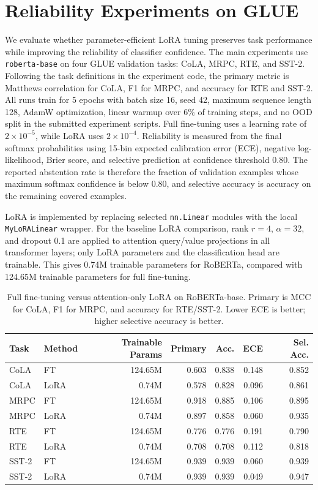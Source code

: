 \section{Reliability Experiments on GLUE}
\label{sec:cola-reliability}

We evaluate whether parameter-efficient LoRA tuning preserves task performance while improving the reliability of classifier confidence. The main experiments use \texttt{roberta-base} on four GLUE validation tasks: CoLA, MRPC, RTE, and SST-2. Following the task definitions in the experiment code, the primary metric is Matthews correlation for CoLA, F1 for MRPC, and accuracy for RTE and SST-2. All runs train for 5 epochs with batch size 16, seed 42, maximum sequence length 128, AdamW optimization, linear warmup over 6\% of training steps, and no OOD split in the submitted experiment scripts. Full fine-tuning uses a learning rate of $2\times 10^{-5}$, while LoRA uses $2\times 10^{-4}$. Reliability is measured from the final softmax probabilities using 15-bin expected calibration error (ECE), negative log-likelihood, Brier score, and selective prediction at confidence threshold 0.80. The reported abstention rate is therefore the fraction of validation examples whose maximum softmax confidence is below 0.80, and selective accuracy is accuracy on the remaining covered examples.

LoRA is implemented by replacing selected \texttt{nn.Linear} modules with the local \texttt{MyLoRALinear} wrapper. For the baseline LoRA comparison, rank $r=4$, $\alpha=32$, and dropout 0.1 are applied to attention query/value projections in all transformer layers; only LoRA parameters and the classification head are trainable. This gives 0.74M trainable parameters for RoBERTa, compared with 124.65M trainable parameters for full fine-tuning.

\begin{table}[t]
\centering
\small
\begin{tabular}{llrrrrr}
\toprule
Task & Method & Trainable Params & Primary & Acc. & ECE & Sel. Acc. \\
\midrule
CoLA & FT & 124.65M & 0.603 & 0.838 & 0.148 & 0.852 \\
CoLA & LoRA & 0.74M & 0.578 & 0.828 & 0.096 & 0.861 \\
MRPC & FT & 124.65M & 0.918 & 0.885 & 0.106 & 0.895 \\
MRPC & LoRA & 0.74M & 0.897 & 0.858 & 0.060 & 0.935 \\
RTE & FT & 124.65M & 0.776 & 0.776 & 0.191 & 0.790 \\
RTE & LoRA & 0.74M & 0.708 & 0.708 & 0.112 & 0.818 \\
SST-2 & FT & 124.65M & 0.939 & 0.939 & 0.060 & 0.939 \\
SST-2 & LoRA & 0.74M & 0.939 & 0.939 & 0.049 & 0.947 \\
\bottomrule
\end{tabular}
\caption{Full fine-tuning versus attention-only LoRA on RoBERTa-base. Primary is MCC for CoLA, F1 for MRPC, and accuracy for RTE/SST-2. Lower ECE is better; higher selective accuracy is better.}
\label{tab:ft-vs-lora-reliability}
\end{table}

